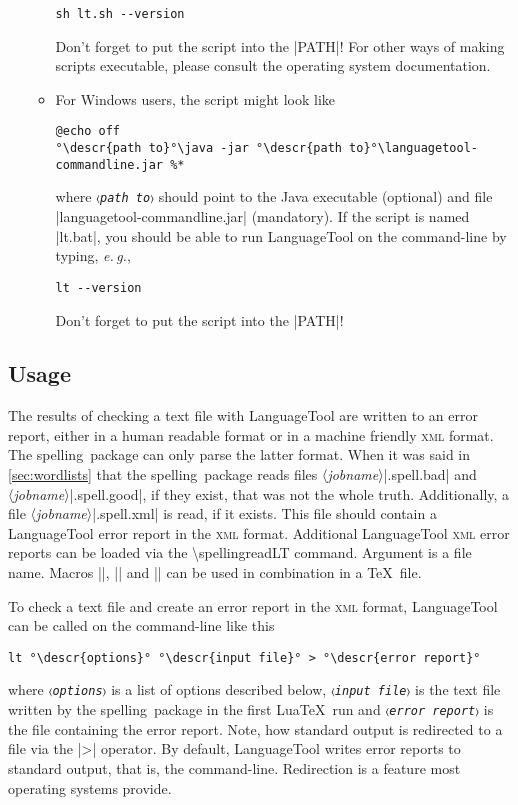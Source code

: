 \documentclass[11pt]{article}
\newcommand*{\pkg}{\textsf{spelling}}
\newcommand*{\acr}[1]{\mbox{\scshape#1}}
\newcommand*{\descr}[1]{〈\emph{#1}〉}
\newcommand*{\cmd}[1]{\mbox{\ttfamily\textbackslash#1}}
\newcommand*{\macro}[1]{\cmd{#1}\marginpar{\cmd{#1}}}
\newcommand*{\latinphrase}[1]{\foreignlanguage{latin}{\emph{#1}}}
\newcommand*{\lpeg}{\latinphrase{e.\,g.}\xspace}
\begin{document}
\begin{enumerate}
\begin{itemize}
\begin{lstlisting}
sh lt.sh --version
\end{lstlisting}
%
    Don't forget to put the script into the |PATH|!  For other ways of
    making scripts executable, please consult the operating system
    documentation.

  \item For Windows users, the script might look like

\begin{lstlisting}[escapeinside=°°]
@echo off
°\descr{path to}°\java -jar °\descr{path to}°\languagetool-commandline.jar %*
\end{lstlisting}
%
    where \texttt{\descr{path to}} should point to the Java executable
    (optional) and file |languagetool-commandline.jar| (mandatory).  If
    the script is named |lt.bat|, you should be able to run LanguageTool
    on the command-line by typing, \lpeg,

\begin{lstlisting}
lt --version
\end{lstlisting}
%
    Don't forget to put the script into the |PATH|!

  \end{itemize}

\end{enumerate}


\subsection{Usage}
\label{sec:lt-usage}

The results of checking a text file with LanguageTool are written to an
error report, either in a human readable format or in a machine friendly
\acr{xml} format.  The \pkg\ package can only parse the latter format.
When it was said in \autoref{sec:wordlists} that the \pkg\ package reads
files \descr{jobname}|.spell.bad| and \descr{jobname}|.spell.good|, if
they exist, that was not the whole truth.  Additionally, a file
\descr{jobname}|.spell.xml| is read, if it exists.  This file should
contain a LanguageTool error report in the \acr{xml} format.  Additional
LanguageTool \acr{xml} error reports can be loaded via the
\macro{spellingreadLT} command.  Argument is a file name.  Macros
|\spellingreadLT|, |\spellingreadbad| and |\spellingreadgood| can be
used in combination in a \TeX\ file.

To check a text file and create an error report in the \acr{xml} format,
LanguageTool can be called on the command-line like this
\begin{lstlisting}[escapeinside=°°]
lt °\descr{options}° °\descr{input file}° > °\descr{error report}°
\end{lstlisting}
where \texttt{\descr{options}} is a list of options described below,
\texttt{\descr{input file}} is the text file written by the \pkg\
package in the first Lua\TeX\ run and \texttt{\descr{error report}} is
the file containing the error report.  Note, how standard output is
redirected to a file via the |>| operator.  By default, LanguageTool
writes error reports to standard output, that is, the command-line.
Redirection is a feature most operating systems provide.
\end{document}
